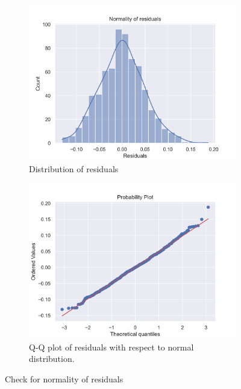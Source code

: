\documentclass[12pt,a4paper]{style}
\begin{document}
\begin{figure}[h]
	\centering
	\begin{subfigure}[t]{0.45\textwidth}
		\includegraphics[width=\textwidth]{normality_residuals.png}
		\caption{Distribution of residuals}
		\label{fig:}
	\end{subfigure}
	\hfill
	\begin{subfigure}[t]{0.45\textwidth}
		\includegraphics[width=\textwidth]{QQ_plot.png}
		\caption{Q-Q plot of residuals with respect to normal distribution.}
		\label{fig:}
	\end{subfigure}
	\caption{Check for normality of residuals}
	\label{fig: normality check}
\end{figure}
\end{document}
